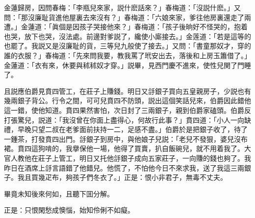 金蓮歸房，因問春梅：「李瓶兒來家，説什麽話來？」春梅道：「沒説什麽。」又問：「那沒廉耻貨進他屋裏去來沒有？」春梅道：「六娘來家，爹往他房裏還走了兩遭。」金蓮道：「眞個是因孩子哭接他來？」春梅道：「孩子後晌好不怪哭的，抱着也哭，放下也哭，沒法處。前邊對爹説了，纔使小廝接去。」金莲道：「若是這等的也罷了。我説又是沒廉耻的貨，三等兒九般使了接去。」又問：「書童那奴才，穿的誰的衣服？」春梅道：「先來問我要，教我罵了玳安出去，落後和上房玉簫借了。」金蓮道：「衣有來，休要與秫秫奴才穿。」説畢，見西門慶不進來，使性兒関了門睡了。

且説應伯爵見賁四管工，在莊子上賺錢。明日又㧱銀子買向五皇親房子，少説也有幾兩銀子背公。行令之間，可可兒賁四不防頭，説出這個笑話兒來，伯爵因此錯他這一錯，使他知道。賁四果然害怕，次日封了三兩銀子，親到伯爵家磕頭。伯爵反打張驚兒，説道：「我沒曾在你面上盡得心，何故行此事？」賁四道：「小人一向缺禮，早晚只望二叔在老爹面前扶持一二，足感不盡。」伯爵於是把銀子收了，待了一鍾茶，打發賁四出門。㧱銀子到房中，與他娘子兒説：「老兒不發狠，婆兒沒布裙。賁四這狗啃的，我擧保他一場，他得了買賣，扒自飯碗兒，就不用着我了。大官人教他在莊子上管工，明日又托他㧱銀子成向五家莊子，一向賺的錢也夠了。我昨日在酒席上㧱言語錯了他錯兒。他慌了，不怕他今日不來求我，送了我這三兩銀子。我且買幾疋布，夠孩子們冬衣了。」正是：恨小非君子，無毒不丈夫。

畢竟未知後來何如，且聽下囬分解。

正是：只恨閑愁成懊惱，始知伶俐不如癡。


